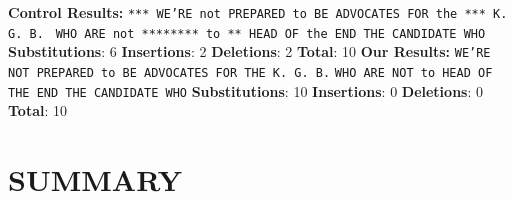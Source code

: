 \documentclass{article}
\begin{document}
\begin{flushleft}
\textbf{Control Results:}\break
\texttt{*** WE'RE not PREPARED to BE ADVOCATES FOR the *** K.\hspace{4pt}  G.\hspace{33pt}        B.  }\break
\texttt{WHO ARE\hspace{9.5pt}   not ******** to ** HEAD\hspace{23pt}      OF\hspace{5pt}  the END THE CANDIDATE WHO }\break
\textbf{Substitutions}: 6 \textbf{Insertions}: 2 \textbf{Deletions}: 2 \textbf{Total}: 10\break\break
\textbf{Our Results:}\break
\texttt{WE'RE NOT PREPARED to BE\hspace{9pt} ADVOCATES FOR THE K.\hspace{4pt} G.\hspace{33pt} B.}\break
\texttt{WHO\hspace{9pt} ARE NOT\hspace{24pt} to HEAD OF\hspace{32pt} THE END THE CANDIDATE WHO}\break
\textbf{Substitutions}: 10 \textbf{Insertions}: 0 \textbf{Deletions}: 0 \textbf{Total}: 10\break



\end{flushleft}

\section{\MakeUppercase{Summary}}
\end{document}
